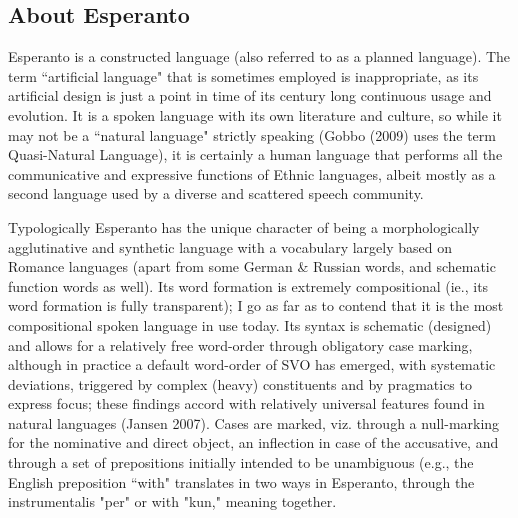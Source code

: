 \documentclass[10pt,a4paper]{article}
\begin{document}
\subsection{About Esperanto}

Esperanto is a constructed language (also referred to as a planned language).
The term ``artificial language" that is sometimes employed is inappropriate, as
its artificial design is just a point in time of its century long continuous
usage and evolution. It is a spoken language with its own literature and culture, so while it
may not  be a ``natural language" strictly speaking (Gobbo (2009) uses the term
Quasi-Natural Language), it is certainly a human language that performs all the
communicative and expressive functions of Ethnic languages, albeit mostly as a
second language used by a diverse and scattered speech community. 

Typologically Esperanto has the unique character of being a morphologically
agglutinative and synthetic language with a vocabulary largely based on
Romance languages (apart from some German \& Russian words, and schematic
function words as well). Its word formation is extremely compositional (ie., its
word formation is fully transparent); I go as far as to contend that it is the
most compositional spoken language in use today. Its syntax is schematic
(designed) and allows for a relatively free word-order through obligatory case
marking, although in practice a default word-order of SVO has emerged, with
systematic deviations, triggered by complex (heavy) constituents and by
pragmatics to express focus; these findings accord with relatively universal
features found in natural languages (Jansen 2007). Cases are marked, viz.
through a null-marking for the nominative and direct object, an inflection in
case of the accusative, and through a set of prepositions initially intended
to be unambiguous (e.g., the English preposition ``with" translates in two ways
in Esperanto, through the instrumentalis "per" or with "kun," meaning
together. 
\end{document}
